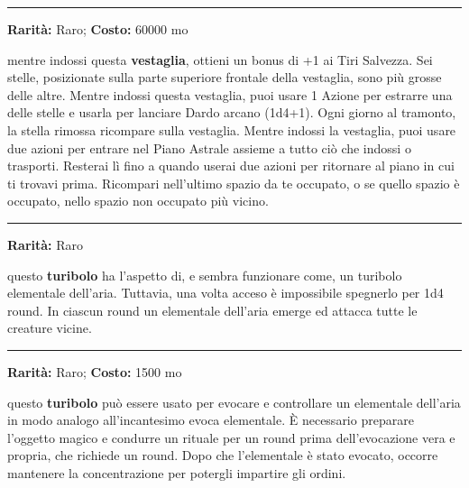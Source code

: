 \begin{multicols}{2}
\smallskip\noindent\rule{\linewidth}{2pt}  \hypertarget{TunicadelleStelle}{}\smallskip{}\noindent\label{TunicadelleStelle}

\textbf{Rarità:} Raro; \textbf{Costo:} 60000 mo

mentre indossi questa \textbf{vestaglia}, ottieni un bonus di +1 ai Tiri Salvezza. Sei stelle, posizionate sulla parte superiore frontale della vestaglia, sono più grosse delle altre. Mentre indossi questa vestaglia, puoi usare 1 Azione per estrarre una delle stelle e usarla per lanciare Dardo arcano (1d4+1). Ogni giorno al tramonto, la stella rimossa ricompare sulla vestaglia. Mentre indossi la vestaglia, puoi usare due azioni per entrare nel Piano Astrale assieme a tutto ciò che indossi o trasporti. Resterai lì fino a quando userai due azioni per ritornare al piano in cui ti trovavi prima. Ricompari nell'ultimo spazio da te occupato, o se quello spazio è occupato, nello spazio non occupato più vicino.

\smallskip\noindent\rule{\linewidth}{2pt}  \hypertarget{Turibolodell'Evocazionemaledetta}{}\smallskip{}\noindent\label{Turibolodell'Evocazionemaledetta}

\textbf{Rarità:} Raro

questo \textbf{turibolo} ha l'aspetto di, e sembra funzionare come, un turibolo elementale dell'aria. Tuttavia, una volta acceso è impossibile spegnerlo per 1d4 round. In ciascun round un elementale dell'aria emerge ed attacca tutte le creature vicine.

\smallskip\noindent\rule{\linewidth}{2pt}  \hypertarget{TuriboloElementaledell'aria}{}\smallskip{}\noindent\label{TuriboloElementaledell'aria}

\textbf{Rarità:} Raro; \textbf{Costo:} 1500 mo

questo \textbf{turibolo} può essere usato per evocare e controllare un elementale dell'aria in modo analogo all'incantesimo evoca elementale. È necessario preparare l'oggetto magico e condurre un rituale per un round prima dell'evocazione vera e propria, che richiede un round. Dopo che l'elementale è stato evocato, occorre mantenere la concentrazione per potergli impartire gli ordini.


\end{multicols}
